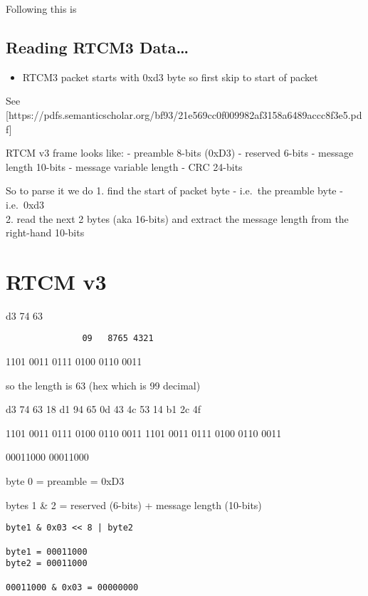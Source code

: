 Following this is

\subsection{Reading RTCM3 Data\ldots{}}\label{reading-rtcm3-data}

\begin{itemize}
\item
  RTCM3 packet starts with 0xd3 byte so first skip to start of packet
\end{itemize}

See
{[}https://pdfs.semanticscholar.org/bf93/21e569cc0f009982af3158a6489accc8f3e5.pdf{]}

RTCM v3 frame looks like: - preamble 8-bits (0xD3) - reserved 6-bits -
message length 10-bits - message variable length - CRC 24-bits

So to parse it we do 1. find the start of packet byte - i.e.~the
preamble byte - i.e.~0xd3\\
2. read the next 2 bytes (aka 16-bits) and extract the message length
from the right-hand 10-bits

\section{RTCM v3}\label{rtcm-v3-2}

d3 74 63

\begin{verbatim}
               09   8765 4321
\end{verbatim}

1101 0011 \textbar{} 0111 0100 \textbar{} 0110 0011 \textbar{}

so the length is 63 (hex which is 99 decimal)

d3 74 63 18 d1 94 65 0d 43 4c 53 14 b1 2c 4f

1101 0011 \textbar{} 0111 0100 \textbar{} 0110 0011 \textbar{} 1101 0011
\textbar{} 0111 0100 \textbar{} 0110 0011

00011000 00011000

byte 0 = preamble = 0xD3

bytes 1 \& 2 = reserved (6-bits) + message length (10-bits)

\begin{verbatim}
byte1 & 0x03 << 8 | byte2

byte1 = 00011000
byte2 = 00011000

00011000 & 0x03 = 00000000
\end{verbatim}

